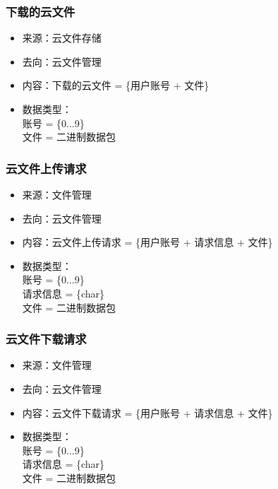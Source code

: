             \subsubsection{下载的云文件}
            \begin{itemize}
            \item 来源：云文件存储
            \item 去向：云文件管理
            \item 内容：下载的云文件 = \{用户账号 + 文件\}
            \item 数据类型：\\
            账号 = \{0...9\}\\
            文件 = 二进制数据包\\
            \end{itemize}

            \subsubsection{云文件上传请求}
            \begin{itemize}
            \item 来源：文件管理
            \item 去向：云文件管理
            \item 内容：云文件上传请求 = \{用户账号 + 请求信息 + 文件\}
            \item 数据类型：\\
            账号 = \{0...9\}\\
            请求信息 = \{char\}\\
            文件 = 二进制数据包\\
            \end{itemize}

            \subsubsection{云文件下载请求}
            \begin{itemize}
            \item 来源：文件管理
            \item 去向：云文件管理
            \item 内容：云文件下载请求 = \{用户账号 + 请求信息 + 文件\}
            \item 数据类型：\\
            账号 = \{0...9\}\\
            请求信息 = \{char\}\\
            文件 = 二进制数据包\\
            \end{itemize}

